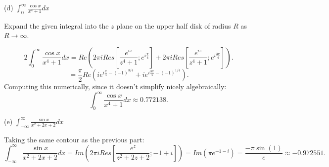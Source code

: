 \documentclass[letterpaper, reqno,11pt]{article}
\begin{document}
(d) $ \int_0^\infty \frac{\cos x}{ x^4 +1} dx $

Expand the given integral into the $z$ plane on the upper half disk of radius $R$ as $R\to \infty$. 

\[
2\int_0^\infty \frac{\cos x}{x^{4}+1}dx=Re\left( 2\pi iRes\left[\frac{e^{iz}}{z^{4}+1};e^{i\frac{\pi}{4}}\right]+2\pi iRes\left[\frac{e^{iz}}{z^{4}+1};e^{i\frac{3\pi}{4}}\right]\right)
.\]
\[
=\frac{\pi}{2} Re\left( ie^{i\frac{\pi}{4}-(-1)^{3 /4}}+ie^{i\frac{3\pi}{4}-(-1)^{1 /4}} \right) 
.\]
Computing this numerically, since it doesn't simplify nicely algebraically: 
\[
 \int_0^\infty \frac{\cos x}{x^{4}+1}dx\approx 0.772138 
.\]

(e) $\int_{-\infty}^\infty \frac{ \sin x}{ x^2+2x+2} dx $

Taking the same contour as the previous part: 
\[
\int_{-\infty}^\infty \frac{ \sin x}{ x^2+2x+2} dx=Im\left( 2\pi i Res\left[\frac{e^{z}}{z^2+2z+2};-1+i\right] \right) =Im\left( \pi e^{-1-i} \right) =\frac{-\pi\sin(1)}{e}\approx -0.972551
.\]
\end{document}
